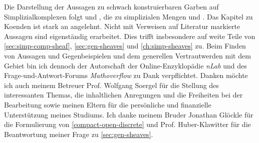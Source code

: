 Die Darstellung der Aussagen zu schwach konstruierbaren Garben auf
Simplizialkomplexen folgt \cite{KS} und \cite{WS}, die zu simplizialen
Mengen \cite{GJ} und \cite{GM}. Das Kapitel zu Koenden ist stark an
\cite{Lore} angelehnt. Nicht mit Verweisen auf Literatur markierte
Aussagen sind eigenständig erarbeitet. Dies trifft insbesondere auf
weite Teile von \autoref{sec:simp-comp-sheaf}, \autoref{sec:gen-sheaves}
und \autoref{ch:simp-sheaves} zu. Beim Finden von Aussagen und
Gegenbeispielen und dem generellen Vertrautwerden mit dem Gebiet bin
ich dennoch der Autorschaft der Online-Enzyklopädie \emph{nLab} und
des Frage-und-Antwort-Forums \emph{Mathoverflow} zu Dank
verpflichtet. Danken möchte ich auch meinem Betreuer Prof. Wolfgang
Soergel für die Stellung des interessanten Themas, die inhaltlichen
Anregungen und die Freiheiten bei der Bearbeitung sowie meinen Eltern
für die persönliche und finanzielle Unterstützung meines Studiums. Ich
danke meinem Bruder Jonathan Glöckle für die Formulierung von
\ref{compact-open-discrete} und Prof. Huber-Klawitter für die
Beantwortung meiner Frage zu \autoref{sec:gen-sheaves}.
